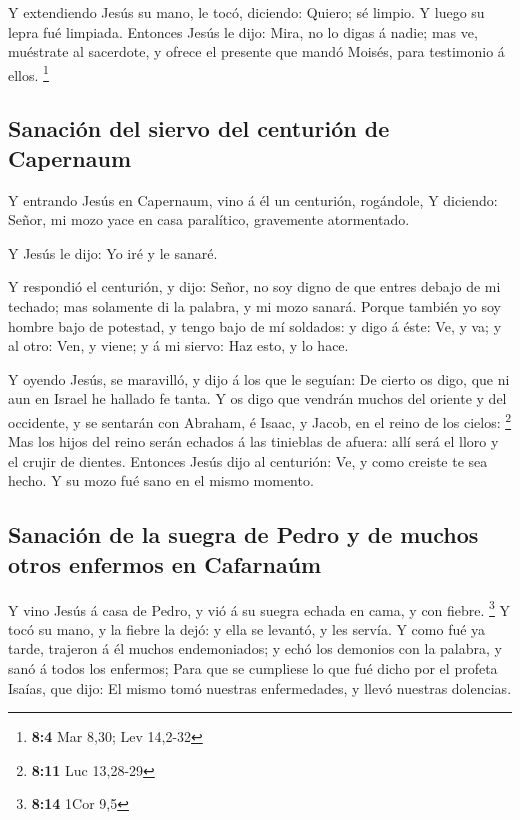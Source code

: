  Y extendiendo Jesús su mano, le tocó, diciendo: Quiero; sé
limpio. Y luego su lepra fué limpiada.  Entonces Jesús le
dijo: Mira, no lo digas á nadie; mas ve, muéstrate al sacerdote, y
ofrece el presente que mandó Moisés, para testimonio á ellos.
\footnote{\textbf{8:4} Mar 8,30; Lev 14,2-32}

\hypertarget{sanaciuxf3n-del-siervo-del-centuriuxf3n-de-capernaum}{%
\subsection{Sanación del siervo del centurión de
Capernaum}\label{sanaciuxf3n-del-siervo-del-centuriuxf3n-de-capernaum}}

 Y entrando Jesús en Capernaum, vino á él un centurión,
rogándole,  Y diciendo: Señor, mi mozo yace en casa
paralítico, gravemente atormentado.

 Y Jesús le dijo: Yo iré y le sanaré.

 Y respondió el centurión, y dijo: Señor, no soy digno de
que entres debajo de mi techado; mas solamente di la palabra, y mi mozo
sanará.  Porque también yo soy hombre bajo de potestad, y
tengo bajo de mí soldados: y digo á éste: Ve, y va; y al otro: Ven, y
viene; y á mi siervo: Haz esto, y lo hace.

 Y oyendo Jesús, se maravilló, y dijo á los que le seguían:
De cierto os digo, que ni aun en Israel he hallado fe tanta.
 Y os digo que vendrán muchos del oriente y del occidente,
y se sentarán con Abraham, é Isaac, y Jacob, en el reino de los cielos:
\footnote{\textbf{8:11} Luc 13,28-29}  Mas los hijos del
reino serán echados á las tinieblas de afuera: allí será el lloro y el
crujir de dientes.  Entonces Jesús dijo al centurión: Ve, y
como creiste te sea hecho. Y su mozo fué sano en el mismo momento.

\hypertarget{sanaciuxf3n-de-la-suegra-de-pedro-y-de-muchos-otros-enfermos-en-cafarnauxfam}{%
\subsection{Sanación de la suegra de Pedro y de muchos otros enfermos en
Cafarnaúm}\label{sanaciuxf3n-de-la-suegra-de-pedro-y-de-muchos-otros-enfermos-en-cafarnauxfam}}

 Y vino Jesús á casa de Pedro, y vió á su suegra echada en
cama, y con fiebre. \footnote{\textbf{8:14} 1Cor 9,5}  Y
tocó su mano, y la fiebre la dejó: y ella se levantó, y les servía.
 Y como fué ya tarde, trajeron á él muchos endemoniados; y
echó los demonios con la palabra, y sanó á todos los enfermos;
 Para que se cumpliese lo que fué dicho por el profeta
Isaías, que dijo: El mismo tomó nuestras enfermedades, y llevó nuestras
dolencias.

